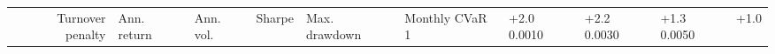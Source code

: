 \begin{tabular}{rlllllll}
\toprule
Turnover penalty & Ann. return & Ann. vol. & Sharpe & Max. drawdown & Monthly CVaR 1%
 & +2.0%
0.0010 & +2.2%
0.0030 & +1.3%
0.0050 & +1.0%
\bottomrule
\end{tabular}

